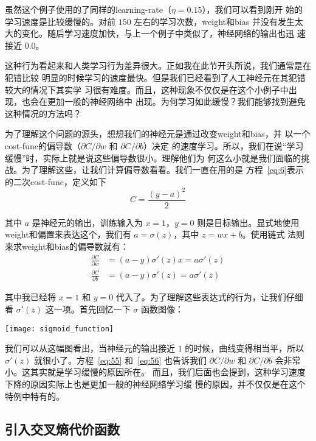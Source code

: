 虽然这个例子使用的了同样的\gls*{learning-rate}（$\eta=0.15$），我们可以看到刚开
始的学习速度是比较缓慢的。对前 $150$ 左右的学习次数，\gls*{weight}和\gls*{bias}
并没有发生太大的变化。随后学习速度加快，与上一个例子中类似了，神经网络的输出也迅
速接近 $0.0$。

这种行为看起来和人类学习行为差异很大。正如我在此节开头所说，我们通常是在犯错比较
明显的时候学习的速度最快。但是我们已经看到了人工神经元在其犯错较大的情况下其实学
习很有难度。而且，这种现象不仅仅是在这个小例子中出现，也会在更加一般的神经网络中
出现。为何学习如此缓慢？我们能够找到避免这种情况的方法吗？

为了理解这个问题的源头，想想我们的神经元是通过改变\gls*{weight}和\gls*{bias}，并
以一个\gls*{cost-func}的偏导数（$\partial C/\partial w$ 和 $\partial C/\partial b$）决定
的速度学习。所以，我们在说“学习缓慢”时，实际上就是说这些偏导数很小。理解他们为
何这么小就是我们面临的挑战。为了理解这些，让我们计算偏导数看看。我们一直在用的是
方程~\eqref{eq:6}表示的二次\gls*{cost-func}，定义如下
\begin{equation}
  C = \frac{(y-a)^2}{2}
\label{eq:54}\tag{54}
\end{equation}

其中 $a$ 是神经元的输出，训练输入为 $x=1$，$y=0$ 则是目标输出。显式地使用%
\gls*{weight}和偏置来表达这个，我们有 $a = \sigma(z)$，其中 $z = wx+b$。使用链式
法则来求\gls*{weight}和\gls*{bias}的偏导数就有：
\begin{align}
  \frac{\partial C}{\partial w} &= (a-y)\sigma'(z) x = a \sigma'(z)\label{eq:55}\tag{55}\\
  \frac{\partial C}{\partial b} &= (a-y)\sigma'(z) = a \sigma'(z)\label{eq:56}\tag{56}
\end{align}

其中我已经将 $x = 1$ 和 $y = 0$ 代入了。为了理解这些表达式的行为，让我们仔细看
$\sigma'(z)$ 这一项。首先回忆一下 $\sigma$ 函数图像：
\begin{center}
  \texttt{[image: sigmoid\_function]}
\end{center}

我们可以从这幅图看出，当神经元的输出接近 $1$ 的时候，曲线变得相当平，所以
$\sigma'(z)$ 就很小了。方程~\eqref{eq:55} 和~\eqref{eq:56} 也告诉我们 $\partial
C/\partial w$ 和 $\partial C/\partial b$ 会非常小。这其实就是学习缓慢的原因所在。
而且，我们后面也会提到，这种学习速度下降的原因实际上也是更加一般的神经网络学习缓
慢的原因，并不仅仅是在这个特例中特有的。

\subsection{引入交叉熵代价函数}
\label{sec:introducing_the_cross-entropy_cost_function}

